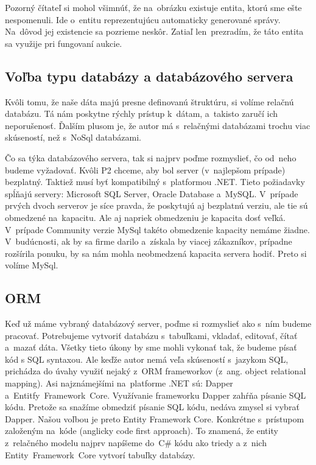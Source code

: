 Pozorný čítateľ si mohol všimnúť, že na~obrázku existuje entita, ktorú sme ešte nespomenuli. Ide o~entitu reprezentujúcu automaticky generované správy. Na~dôvod jej existencie sa pozrieme neskôr. Zatiaľ len~prezradím, že táto entita sa využije pri fungovaní aukcie.

\subsection{Voľba typu databázy a databázového servera}

Kvôli tomu, že naše dáta majú presne definovanú štruktúru, si volíme relačnú databázu. Tá nám poskytne rýchly prístup k~dátam, a~takisto zaručí ich neporušenosť. Ďalším plusom je, že autor má s~relačnými databázami trochu viac skúseností, než s~NoSql databázami.

Čo sa týka databázového servera, tak si najprv poďme rozmyslieť, čo od~neho budeme vyžadovať. Kvôli P2 chceme, aby bol server (v~najlepšom prípade) bezplatný. Taktiež musí byť kompatibilný s~platformou .NET. Tieto požiadavky spĺňajú servery: Microsoft SQL Server, Oracle Database a~MySQL. V~prípade prvých dvoch serverov je síce pravda, že poskytujú aj bezplatnú verziu, ale tie sú obmedzené na~kapacitu. Ale aj napriek obmedzeniu je kapacita dosť veľká. V~prípade Community verzie MySql takéto obmedzenie kapacity nemáme žiadne. V~budúcnosti, ak by sa firme darilo a~získala by viacej zákazníkov, prípadne rozšírila ponuku, by sa nám mohla neobmedzená kapacita servera hodiť. Preto si volíme MySql.

\subsection{ORM}

Keď už máme vybraný databázový server, poďme si rozmyslieť ako s~ním budeme pracovať. Potrebujeme vytvoriť databázu s~tabuľkami, vkladať, editovať, čítať a~mazať dáta. Všetky tieto úkony by sme mohli vykonať tak, že budeme písať kód s SQL syntaxou. Ale keďže autor nemá veľa skúseností s~jazykom SQL, prichádza do úvahy využiť nejaký z~ORM frameworkov (z~ang. object relational mapping). Asi najznámejšími na~platforme .NET sú: Dapper a~Entitfy~Framework~Core. Využívanie frameworku Dapper zahŕňa písanie SQL kódu. Pretože sa snažíme obmedziť písanie SQL kódu, nedáva zmysel si vybrať Dapper. Našou voľbou je preto Entity Framework Core. Konkrétne s~prístupom založeným na~kóde (anglicky code first approach). To znamená, že entity z~relačného modelu najprv napíšeme do~C\# kódu ako triedy a z~nich Entity~Framework~Core vytvorí tabuľky databázy.

